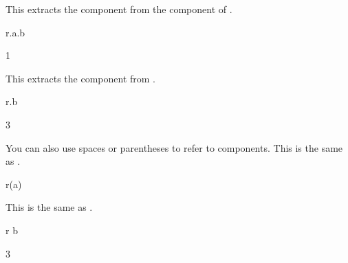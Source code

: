 \begin{xtc}
\begin{xtccomment}
This extracts the  component from the  component of .
\end{xtccomment}
\begin{spadsrc}
r.a.b 
\end{spadsrc}
\begin{TeXOutput}
\begin{fricasmath}{13}
1%
\end{fricasmath}
\end{TeXOutput}
\end{xtc}
\begin{xtc}
\begin{xtccomment}
This extracts the  component from .
\end{xtccomment}
\begin{spadsrc}
r.b 
\end{spadsrc}
\begin{TeXOutput}
\begin{fricasmath}{14}
3%
\end{fricasmath}
\end{TeXOutput}
\end{xtc}
%
\begin{xtc}
\begin{xtccomment}
You can also use spaces or parentheses to refer to 
components.
This is the same as .
\end{xtccomment}
\begin{spadsrc}
r(a) 
\end{spadsrc}
\begin{TeXOutput}
\begin{fricasmath}{15}
%
\end{fricasmath}
\end{TeXOutput}
\end{xtc}
\begin{xtc}
\begin{xtccomment}
This is the same as .
\end{xtccomment}
\begin{spadsrc}
r b 
\end{spadsrc}
\begin{TeXOutput}
\begin{fricasmath}{16}
3%
\end{fricasmath}
\end{TeXOutput}
\end{xtc}
